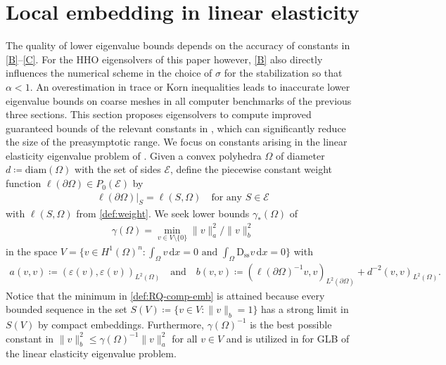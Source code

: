 \documentclass[a4paper]{amsart}
\numberwithin{equation}{section}
\renewcommand{\d}[1]{\,\mathrm{d}#1}
\newcommand{\D}{\mathrm{D}}
\theoremstyle{remark}
\theoremstyle{definition}
\theoremstyle{assumptionnoperiod}
\begin{document}
\section{Local embedding in linear elasticity}\label{sec:compact-emb}
The quality of lower eigenvalue bounds depends on the accuracy of constants in \ref{B}--\ref{C}. For the HHO eigensolvers of this paper however, \ref{B} also directly influences the
numerical scheme in the choice of $\sigma$ for the stabilization so that $\alpha < 1$.
An overestimation in trace or Korn inequalities leads to inaccurate lower eigenvalue bounds on coarse meshes in all computer benchmarks of the previous three sections.
This section proposes eigensolvers to compute improved guaranteed bounds of the relevant constants in , which can significantly reduce the size of the preasymptotic range.
We focus on constants arising in the linear elasticity eigenvalue problem of .
Given a convex polyhedra $\Omega$ of diameter $d \coloneqq \mathrm{diam}(\Omega)$ with the set of sides $\mathcal{E}$,
define the piecewise constant weight function $\ell(\partial \Omega) \in P_0(\mathcal{E})$ by
\begin{align*}
	\ell(\partial\Omega)|_S = \ell(S,\Omega) \quad\text{for any } S \in \mathcal{E}
\end{align*}
with $\ell(S,\Omega)$ from \eqref{def:weight}.
We seek lower bounds $\gamma_*(\Omega)$ of
\begin{align}\label{def:RQ-comp-emb}
	\gamma(\Omega) = \min_{v \in V\setminus \{0\}} \|v\|_a^2/\|v\|^2_b
\end{align}
in the space $V = \{v \in H^1(\Omega)^n : \int_\Omega v \d{x} = 0 \text{ and } \int_\Omega \D_\mathrm{ss} v \d{x} = 0\}$ with
\begin{align*}
	a(v,v) \coloneqq (\varepsilon(v),\varepsilon(v))_{L^2(\Omega)} \quad\text{and}\quad
	b(v,v) \coloneqq (\ell(\partial \Omega)^{-1} v,v)_{L^2(\partial \Omega)} + d^{-2}(v,v)_{L^2(\Omega)}.
\end{align*}
Notice that the minimum in \eqref{def:RQ-comp-emb} is attained because every bounded sequence in the set $S(V) \coloneqq \{v \in V : \|v\|_b = 1\}$ has a strong limit in $S(V)$ by compact embeddings.
Furthermore, $\gamma(\Omega)^{-1}$ is the best possible constant in $\|v\|_b^2 \leq \gamma(\Omega)^{-1}\|v\|_a^2$ for all $v \in V$ and is utilized in  for GLB of the linear elasticity eigenvalue problem.
\end{document}
